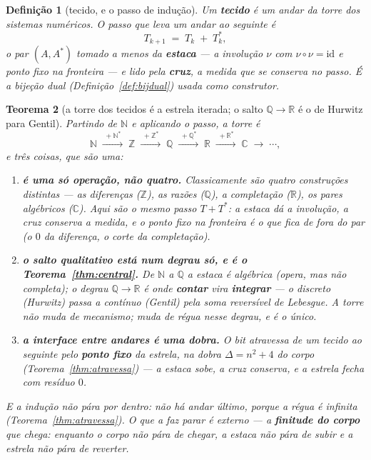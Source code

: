 \documentclass[11pt,a4paper]{article}
\newtheorem{teorema}{Teorema}
\newtheorem{definicao}[teorema]{Definição}
\begin{document}
\begin{definicao}[tecido, e o passo de indução]\label{def:tecido}
Um \textbf{tecido} é um andar da torre dos sistemas numéricos. O passo que leva um andar ao seguinte é
\[
  T_{k+1} \;=\; T_k \;+\; T_k^{*},
\]
o par $(A,A^*)$ tomado a menos da \textbf{estaca} --- a involução $\nu$ com $\nu\circ\nu=\mathrm{id}$ e
ponto fixo \emph{na fronteira} --- e lido pela \textbf{cruz}, a medida que se conserva no passo. É a
bijeção dual (Definição~\ref{def:bijdual}) usada como \emph{construtor}.
\end{definicao}

\begin{teorema}[a torre dos tecidos é a estrela iterada; o salto $\mathbb{Q}\to\mathbb{R}$ é o de Hurwitz para Gentil]\label{thm:tecidos}
Partindo de $\mathbb{N}$ e aplicando o passo, a torre é
\[
  \mathbb{N} \;\xrightarrow{\;+\mathbb{N}^{*}\;}\; \mathbb{Z} \;\xrightarrow{\;+\mathbb{Z}^{*}\;}\; \mathbb{Q}
     \;\xrightarrow{\;+\mathbb{Q}^{*}\;}\; \mathbb{R} \;\xrightarrow{\;+\mathbb{R}^{*}\;}\; \mathbb{C} \;\longrightarrow\;\cdots,
\]
e três coisas, que são uma:
\begin{enumerate}
\item \textbf{é uma só operação, não quatro.} Classicamente são quatro construções distintas --- as
  diferenças ($\mathbb{Z}$), as razões ($\mathbb{Q}$), a completação ($\mathbb{R}$), os pares algébricos ($\mathbb{C}$). Aqui são o
  \emph{mesmo} passo $T{+}T^{*}$: a estaca dá a involução, a cruz conserva a medida, e o ponto fixo na
  fronteira é o que fica de \emph{fora} do par (o $0$ da diferença, o corte da completação).
\item \textbf{o salto qualitativo está num degrau só, e é o Teorema~\ref{thm:central}.} De $\mathbb{N}$ a $\mathbb{Q}$
  a estaca é \emph{algébrica} (opera, mas não completa); o degrau $\mathbb{Q}\to\mathbb{R}$ é onde \textbf{contar} vira
  \textbf{integrar} --- o discreto (Hurwitz) passa a contínuo (Gentil) pela soma reversível de Lebesgue.
  A torre não muda de mecanismo; muda de \emph{régua} nesse degrau, e é o único.
\item \textbf{a interface entre andares é uma dobra.} O bit atravessa de um tecido ao seguinte pelo
  \textbf{ponto fixo} da estrela, na dobra $\Delta=n^2+4$ do corpo (Teorema~\ref{thm:atravessa}) --- a
  estaca sobe, a cruz conserva, e a estrela fecha com resíduo $0$.
\end{enumerate}
\emph{E a indução não pára por dentro:} não há andar último, porque a régua é infinita
(Teorema~\ref{thm:atravessa}). O que a faz parar é \emph{externo} --- a \textbf{finitude do corpo} que
chega: enquanto o corpo não pára de chegar, a estaca não pára de subir e a estrela não pára de reverter.
\end{teorema}
\end{document}
